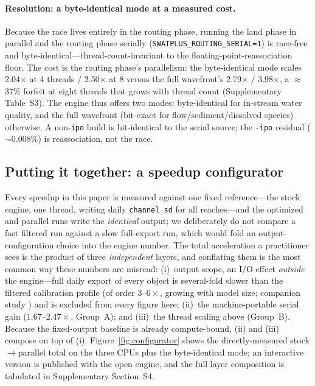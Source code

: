 \paragraph{Resolution: a byte-identical mode at a measured cost.} Because the race lives entirely in
the routing phase, running the land phase in parallel and the routing phase serially
(\texttt{SWATPLUS\_ROUTING\_SERIAL=1}) is race-free and byte-identical---thread-count-invariant to the
floating-point-reassociation floor. The cost is the routing phase's parallelism: the byte-identical
mode scales 2.04$\times$ at 4 threads / 2.50$\times$ at 8 versus the full wavefront's
2.79$\times$ / 3.98$\times$, a $\approx$37\% forfeit at eight threads that grows with thread
count (Supplementary Table~S3). The engine thus offers two modes: byte-identical for in-stream water
quality, and the full wavefront (bit-exact for flow/sediment/dissolved species) otherwise. A
non-\texttt{ipo} build is bit-identical to the serial source; the \texttt{-ipo} residual
($\sim$0.008\%) is reassociation, not the race.

\subsection{Putting it together: a speedup configurator}\label{sec:configurator}
Every speedup in this paper is measured against one fixed reference---the stock engine, one
thread, writing daily \texttt{channel\_sd} for all reaches---and the optimized and parallel runs
write the \emph{identical} output; we deliberately do not compare a fast filtered run against a slow
full-export run, which would fold an output-configuration choice into the engine number. The total
acceleration a practitioner sees is the product of three \emph{independent} layers, and conflating
them is the most common way these numbers are misread: (i)~output scope, an I/O effect
\emph{outside} the engine---full daily export of every object is several-fold slower than the
filtered calibration profile (of order $3$--$6\times$, growing with model size; companion study
\citep{Rafiei2026SWATGenX}) and is excluded from every figure here; (ii)~the machine-portable
serial gain ($1.67$--$2.47\times$, Group~A); and (iii)~the thread scaling above
(Group~B). Because the fixed-output baseline is already compute-bound, (ii) and (iii) compose on top
of (i). Figure~\ref{fig:configurator} shows the directly-measured stock$\rightarrow$parallel total on
the three CPUs plus the byte-identical mode; an interactive version is published with the open
engine, and the full layer composition is tabulated in Supplementary Section~S4.

